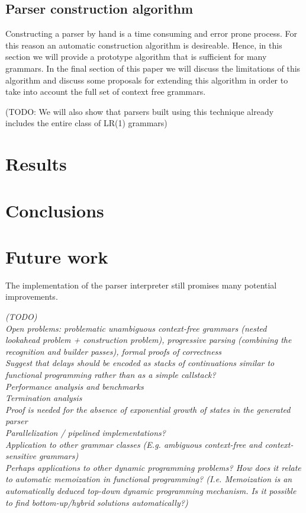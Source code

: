 \documentclass[11pt]{article}
\begin{document}
\subsection{Parser construction algorithm}
Constructing a parser by hand is a time consuming and error prone process. For this reason an automatic construction algorithm is desireable. 
Hence, in this section we will provide a prototype algorithm that is sufficient for many grammars. 
In the final section of this paper we will discuss the limitations of this algorithm and discuss some proposals for extending this algorithm in order to take into account the full set
of context free grammars. 

(TODO: We will also show that parsers built using this technique already includes the entire class of LR(1) grammars)

\section*{Results}

\section*{Conclusions}

\section*{Future work}

The implementation of the parser interpreter still promises many potential improvements. 

\emph{ %
(TODO)\\
Open problems: problematic unambiguous context-free grammars (nested lookahead problem + construction problem), progressive parsing (combining the recognition and builder passes), formal proofs of correctness\\
Suggest that delays should be encoded as stacks of continuations similar to functional programming rather than as a simple callstack?\\
Performance analysis and benchmarks\\
Termination analysis\\
Proof is needed for the absence of exponential growth of states in the generated parser\\
Parallelization / pipelined implementations?\\
Application to other grammar classes (E.g. ambiguous context-free and context-sensitive grammars)\\
Perhaps applications to other dynamic programming problems? How does it relate to automatic memoization in functional programming? (I.e. Memoization is an automatically deduced top-down dynamic programming mechanism. Is it possible to find bottom-up/hybrid solutions automatically?)
}



\end{document}
